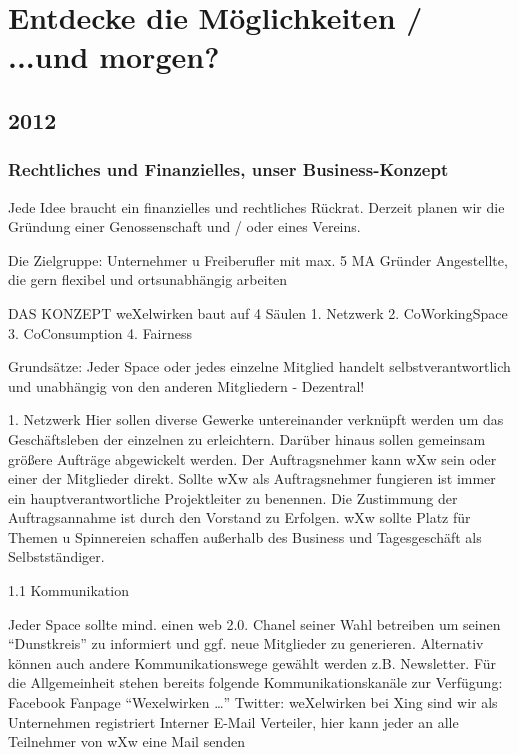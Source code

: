 \chapter{Entdecke die Möglichkeiten / ...und morgen?}

  \section{2012}
\subsection{Rechtliches und Finanzielles, unser Business-Konzept}

Jede Idee braucht ein finanzielles und rechtliches Rückrat. 
Derzeit planen wir die Gründung einer Genossenschaft und / oder eines Vereins.

Die Zielgruppe:
Unternehmer u Freiberufler mit max. 5 MA
Gründer
Angestellte, die gern flexibel und ortsunabhängig arbeiten 


DAS KONZEPT
weXelwirken baut auf 4 Säulen
1. Netzwerk
2. CoWorkingSpace
3. CoConsumption 
4. Fairness 

Grundsätze:
Jeder Space oder jedes einzelne Mitglied handelt selbstverantwortlich und unabhängig von den anderen Mitgliedern - Dezentral!



1. Netzwerk
Hier sollen diverse Gewerke untereinander verknüpft werden um das Geschäftsleben der einzelnen zu erleichtern. Darüber hinaus sollen gemeinsam größere Aufträge abgewickelt werden. Der Auftragsnehmer kann wXw sein oder einer der Mitglieder direkt.
Sollte wXw als Auftragsnehmer fungieren ist immer ein hauptverantwortliche Projektleiter zu benennen. Die Zustimmung der Auftragsannahme ist durch den Vorstand zu Erfolgen.
wXw sollte Platz für Themen u Spinnereien schaffen außerhalb des Business und Tagesgeschäft als Selbstständiger.

1.1 Kommunikation 

Jeder Space sollte mind. einen web 2.0. Chanel seiner Wahl betreiben um seinen "`Dunstkreis"' zu informiert und ggf. neue Mitglieder zu generieren. Alternativ können auch andere Kommunikationswege gewählt werden z.B. Newsletter.
Für die Allgemeinheit stehen bereits folgende Kommunikationskanäle zur Verfügung:
Facebook Fanpage "`Wexelwirken …"'
Twitter: weXelwirken
bei Xing sind wir als Unternehmen registriert
Interner E-Mail Verteiler, hier kann jeder an alle Teilnehmer von wXw eine Mail senden 


